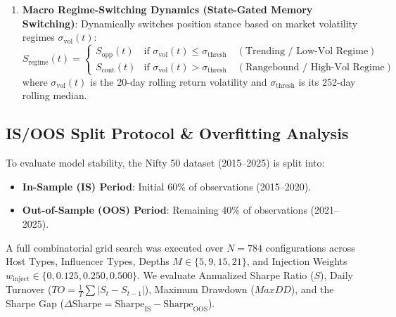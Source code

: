 \documentclass[11pt,a4paper]{article}
\begin{document}
\begin{enumerate}
    \item \textbf{Macro Regime-Switching Dynamics (State-Gated Memory Switching)}: Dynamically switches position stance based on market volatility regimes $\sigma_{\text{vol}}(t)$:
    \begin{equation}
        S_{\text{regime}}(t) = 
        \begin{cases}
            S_{\text{opp}}(t) & \text{if } \sigma_{\text{vol}}(t) \le \sigma_{\text{thresh}} \quad (\text{Trending / Low-Vol Regime}) \\
            S_{\text{cont}}(t) & \text{if } \sigma_{\text{vol}}(t) > \sigma_{\text{thresh}} \quad (\text{Rangebound / High-Vol Regime})
        \end{cases}
    \end{equation}
    where $\sigma_{\text{vol}}(t)$ is the 20-day rolling return volatility and $\sigma_{\text{thresh}}$ is its 252-day rolling median.
\end{enumerate}

\subsection{IS/OOS Split Protocol & Overfitting Analysis}
To evaluate model stability, the Nifty 50 dataset (2015--2025) is split into:
\begin{itemize}
    \item \textbf{In-Sample (IS) Period}: Initial 60\% of observations (2015--2020).
    \item \textbf{Out-of-Sample (OOS) Period}: Remaining 40\% of observations (2021--2025).
\end{itemize}

A full combinatorial grid search was executed over $N=784$ configurations across Host Types, Influencer Types, Depths $M \in \{5, 9, 15, 21\}$, and Injection Weights $w_{\text{inject}} \in \{0, 0.125, 0.250, 0.500\}$. We evaluate Annualized Sharpe Ratio ($S$), Daily Turnover ($TO = \frac{1}{T}\sum |S_t - S_{t-1}|$), Maximum Drawdown ($MaxDD$), and the Sharpe Gap ($\Delta \text{Sharpe} = \text{Sharpe}_{\text{IS}} - \text{Sharpe}_{\text{OOS}}$).
\end{document}
